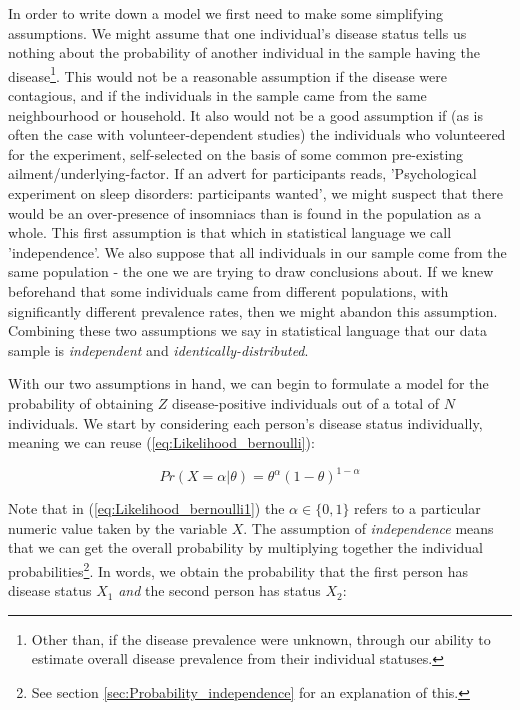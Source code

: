 \documentclass[11pt,fullpage]{book}
\begin{document}
In order to write down a model we first need to make some simplifying assumptions. We might assume that one individual's disease status tells us nothing about the probability of another individual in the sample having the disease\footnote{Other than, if the disease prevalence were unknown, through our ability to estimate overall disease prevalence from their individual statuses.}. This would not be a reasonable assumption if the disease were contagious, and if the individuals in the sample came from the same neighbourhood or household. It also would not be a good assumption if (as is often the case with volunteer-dependent studies) the individuals who volunteered for the experiment, self-selected on the basis of some common pre-existing ailment/underlying-factor. If an advert for participants reads, 'Psychological experiment on sleep disorders: participants wanted', we might suspect that there would be an over-presence of insomniacs than is found in the population as a whole. This first assumption is that which in statistical language we call 'independence'. We also suppose that all individuals in our sample come from the same population - the one we are trying to draw conclusions about. If we knew beforehand that some individuals came from different populations, with significantly different prevalence rates, then we might abandon this assumption. Combining these two assumptions we say in statistical language that our data sample is \textit{independent} and \textit{identically-distributed}.

With our two assumptions in hand, we can begin to formulate a model for the probability of obtaining $Z$ disease-positive individuals out of a total of $N$ individuals. We start by considering each person's disease status individually, meaning we can reuse (\ref{eq:Likelihood_bernoulli}):

\begin{equation}\label{eq:Likelihood_bernoulli1}
Pr(X=\alpha|\theta) = \theta^\alpha(1-\theta)^{1-\alpha}
\end{equation}

Note that in (\ref{eq:Likelihood_bernoulli1}) the $\alpha\in\{0,1\}$ refers to a particular numeric value taken by the variable $X$. The assumption of \textit{independence} means that we can get the overall probability by multiplying together the individual probabilities\footnote{See section \ref{sec:Probability_independence} for an explanation of this.}. In words, we obtain the probability that the first person has disease status $X_1$ \textit{and} the second person has status $X_2$:
\end{document}
